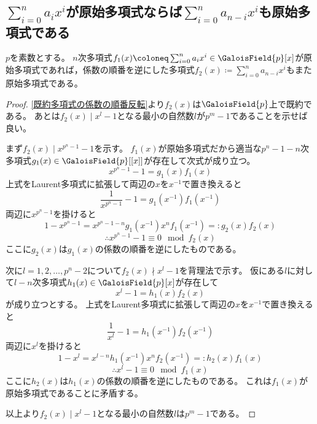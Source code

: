         \subsection{\texorpdfstring{$\sum_{i=0}^n a_ix^i$}{a0 x0 + a1 x1 + ...}が原始多項式ならば\texorpdfstring{$\sum_{i=0}^n a_{n-i}x^i$}{a\{n-1\} x0 + a\{n-2\} x1 + ...}も原始多項式である}
            \begin{shadebox}
                $p$を素数とする。
                $n$次多項式$f_1(x) \coloneq \sum_{i=0}^n a_ix^i \in \GaloisField{p}[x]$が原始多項式であれば，係数の順番を逆にした多項式$f_2(x) \coloneq \sum_{i=0}^n a_{n-i}x^i$もまた原始多項式である。
            \end{shadebox}
            \begin{proof}
                \quad\par
                \ref{既約多項式の係数の順番反転}より$f_2(x)$は$\GaloisField{p}$上で既約である。
                あとは$f_2(x) \mid x^l - 1$となる最小の自然数$l$が$p^m-1$であることを示せば良い。
                \par
                まず$f_2(x) \mid x^{p^n-1}-1$を示す。
                $f_1(x)$が原始多項式だから適当な$p^n-1-n$次多項式$g_1(x) \in \GaloisField{p}[[x]]$が存在して次式が成り立つ。
                \[ x^{p^n-1} - 1 = g_1(x)f_1(x) \]
                上式をLaurent多項式に拡張して両辺の$x$を$x^{-1}$で置き換えると
                \[ \frac{1}{x^{p^n-1}} - 1 = g_1(x^{-1})f_1(x^{-1}) \]
                両辺に$x^{p^n-1}$を掛けると
                \[ 1 - x^{p^n-1} = x^{p^n-1-n}g_1(x^{-1}) x^n f_1(x^{-1}) =: g_2(x)f_2(x) \]
                \[ \therefore x^{p^n-1} -1 \equiv 0 \mod f_2(x) \]
                ここに$g_2(x)$は$g_1(x)$の係数の順番を逆にしたものである。
                \par
                次に$l=1,2,\dotsc,p^n-2$について$f_2(x) \nmid x^l-1$を背理法で示す。
                仮にある$l$に対して$l-n$次多項式$h_1(x) \in \GaloisField{p}[x]$が存在して
                \[ x^l - 1 = h_1(x)f_2(x) \]
                が成り立つとする。
                上式をLaurent多項式に拡張して両辺の$x$を$x^{-1}$で置き換えると
                \[ \frac{1}{x^l} - 1 = h_1(x^{-1})f_2(x^{-1}) \]
                両辺に$x^l$を掛けると
                \[ 1 - x^l = x^{l-n}h_1(x^{-1}) x^n f_2(x^{-1}) =: h_2(x)f_1(x) \]
                \[ \therefore x^l - 1 \equiv 0 \mod f_1(x) \]
                ここに$h_2(x)$は$h_1(x)$の係数の順番を逆にしたものである。
                これは$f_1(x)$が原始多項式であることに矛盾する。
                \par
                以上より$f_2(x) \mid x^l - 1$となる最小の自然数$l$は$p^m-1$である。
            \end{proof}